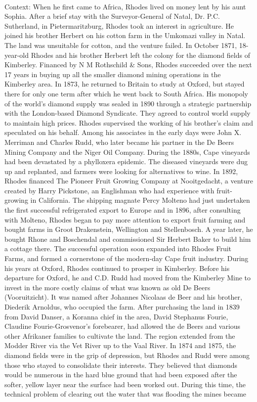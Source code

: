 \documentclass[11pt,a4paper, onecolumn]{article}
\begin{document}
\\ Context: When he first came to Africa, Rhodes lived on money lent by his aunt Sophia. After a brief stay with the Surveyor-General of Natal, Dr. P.C. Sutherland, in Pietermaritzburg, Rhodes took an interest in agriculture. He joined his brother Herbert on his cotton farm in the Umkomazi valley in Natal. The land was unsuitable for cotton, and the venture failed. In October 1871, 18-year-old Rhodes and his brother Herbert left the colony for the diamond fields of Kimberley. Financed by N M Rothschild & Sons, Rhodes succeeded over the next 17 years in buying up all the smaller diamond mining operations in the Kimberley area. In 1873, he returned to Britain to study at Oxford, but stayed there for only one term after which he went back to South Africa. His monopoly of the world's diamond supply was sealed in 1890 through a strategic partnership with the London-based Diamond Syndicate. They agreed to control world supply to maintain high prices. Rhodes supervised the working of his brother's claim and speculated on his behalf. Among his associates in the early days were John X. Merriman and Charles Rudd, who later became his partner in the De Beers Mining Company and the Niger Oil Company. During the 1880s, Cape vineyards had been devastated by a phylloxera epidemic. The diseased vineyards were dug up and replanted, and farmers were looking for alternatives to wine. In 1892, Rhodes financed The Pioneer Fruit Growing Company at Nooitgedacht, a venture created by Harry Pickstone, an Englishman who had experience with fruit-growing in California. The shipping magnate Percy Molteno had just undertaken the first successful refrigerated export to Europe and in 1896, after consulting with Molteno, Rhodes began to pay more attention to export fruit farming and bought farms in Groot Drakenstein, Wellington and Stellenbosch. A year later, he bought Rhone and Boschendal and commissioned Sir Herbert Baker to build him a cottage there. The successful operation soon expanded into Rhodes Fruit Farms, and formed a cornerstone of the modern-day Cape fruit industry. During his years at Oxford, Rhodes continued to prosper in Kimberley. Before his departure for Oxford, he and C.D. Rudd had moved from the Kimberley Mine to invest in the more costly claims of what was known as old De Beers (Vooruitzicht). It was named after Johannes Nicolaas de Beer and his brother, Diederik Arnoldus, who occupied the farm. After purchasing the land in 1839 from David Danser, a Koranna chief in the area, David Stephanus Fourie, Claudine Fourie-Grosvenor's forebearer, had allowed the de Beers and various other Afrikaner families to cultivate the land. The region extended from the Modder River via the Vet River up to the Vaal River. In 1874 and 1875, the diamond fields were in the grip of depression, but Rhodes and Rudd were among those who stayed to consolidate their interests. They believed that diamonds would be numerous in the hard blue ground that had been exposed after the softer, yellow layer near the surface had been worked out. During this time, the technical problem of clearing out the water that was flooding the mines became 
\end{document}
